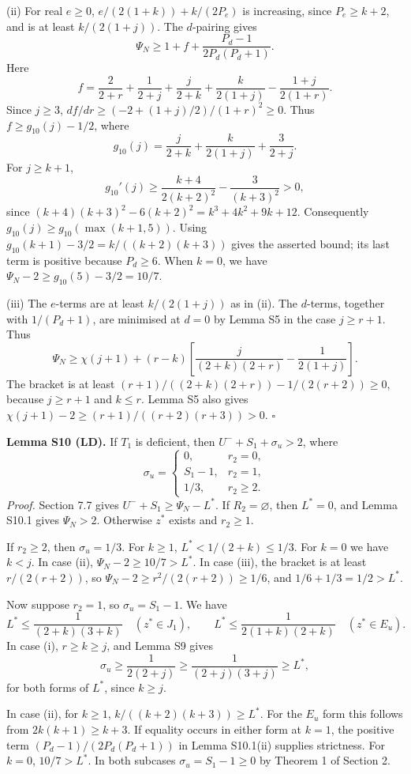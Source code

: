 (ii) For real $e\ge0$, $e/(2(1+k))+k/(2P_e)$ is increasing, since $P_e\ge k+2$, and is at least $k/(2(1+j))$. The $d$-pairing gives
\[
 \Psi_N\ge1+f+\frac{P_d-1}{2P_d(P_d+1)}.
\]
Here
\[
 f=\frac2{2+r}+\frac1{2+j}+\frac j{2+k}+\frac k{2(1+j)}-\frac{1+j}{2(1+r)}.
\]
Since $j\ge3$, $df/dr\ge(-2+(1+j)/2)/(1+r)^2\ge0$. Thus $f\ge g_{10}(j)-1/2$, where
\[
 g_{10}(j)=\frac j{2+k}+\frac k{2(1+j)}+\frac3{2+j}.
\]
For $j\ge k+1$,
\[
 g_{10}'(j)\ge\frac{k+4}{2(k+2)^2}-\frac3{(k+3)^2}>0,
\]
since $(k+4)(k+3)^2-6(k+2)^2=k^3+4k^2+9k+12$. Consequently $g_{10}(j)\ge g_{10}(\max(k+1,5))$. Using
$g_{10}(k+1)-3/2=k/((k+2)(k+3))$ gives the asserted bound; its last term is positive because $P_d\ge6$. When $k=0$, we have $\Psi_N-2\ge g_{10}(5)-3/2=10/7$.

(iii) The $e$-terms are at least $k/(2(1+j))$ as in (ii). The $d$-terms, together with $1/(P_d+1)$, are minimised at $d=0$ by Lemma S5 in the case $j\ge r+1$. Thus
\[
 \Psi_N\ge\chi(j+1)+(r-k)\left[\frac j{(2+k)(2+r)}-\frac1{2(1+j)}\right].
\]
The bracket is at least $(r+1)/((2+k)(2+r))-1/(2(r+2))\ge0$, because $j\ge r+1$ and $k\le r$. Lemma S5 also gives $\chi(j+1)-2\ge(r+1)/((r+2)(r+3))>0$. \hfill$\square$

\textbf{Lemma S10 (LD).} If $T_1$ is deficient, then $U^-+S_1+\sigma_u>2$, where
\[
 \sigma_u=\begin{cases}0,&r_2=0,\\S_1-1,&r_2=1,\\1/3,&r_2\ge2.\end{cases}
\]
\emph{Proof.} Section 7.7 gives $U^-+S_1\ge\Psi_N-L^*$. If $R_2=\varnothing$, then $L^*=0$, and Lemma S10.1 gives $\Psi_N>2$. Otherwise $z^*$ exists and $r_2\ge1$.

If $r_2\ge2$, then $\sigma_u=1/3$. For $k\ge1$, $L^*<1/(2+k)\le1/3$. For $k=0$ we have $k<j$. In case (ii), $\Psi_N-2\ge10/7>L^*$. In case (iii), the bracket is at least $r/(2(r+2))$, so $\Psi_N-2\ge r^2/(2(r+2))\ge1/6$, and $1/6+1/3=1/2>L^*$.

Now suppose $r_2=1$, so $\sigma_u=S_1-1$. We have
\[
 L^*\le\frac1{(2+k)(3+k)}\quad(z^*\in J_1),\qquad
 L^*\le\frac1{2(1+k)(2+k)}\quad(z^*\in E_u).
\]
In case (i), $r\ge k\ge j$, and Lemma S9 gives
\[
 \sigma_u\ge\frac1{2(2+j)}\ge\frac1{(2+j)(3+j)}\ge L^*,
\]
for both forms of $L^*$, since $k\ge j$.

In case (ii), for $k\ge1$, $k/((k+2)(k+3))\ge L^*$. For the $E_u$ form this follows from $2k(k+1)\ge k+3$. If equality occurs in either form at $k=1$, the positive term $(P_d-1)/(2P_d(P_d+1))$ in Lemma S10.1(ii) supplies strictness. For $k=0$, $10/7>L^*$. In both subcases $\sigma_u=S_1-1\ge0$ by Theorem 1 of Section 2.

